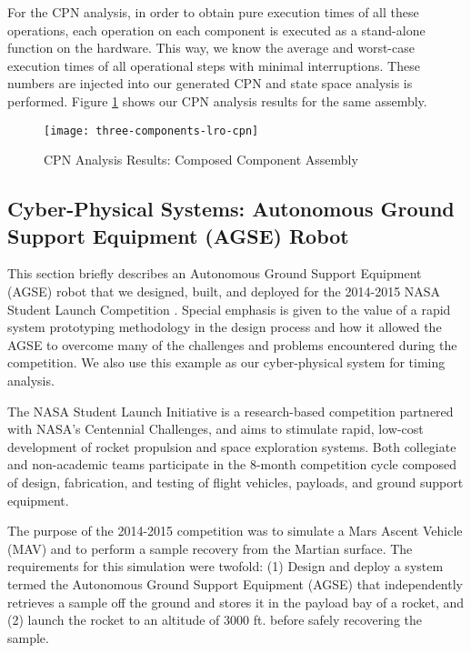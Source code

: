 For the CPN analysis, in order to obtain pure execution times of all these operations, each operation on each component is executed as a stand-alone function on the hardware. This way, we know the average and worst-case execution times of all operational steps with minimal interruptions. These numbers are injected into our generated CPN and state space analysis is performed. Figure \ref{fig:three-components-lro-cpn} shows our CPN analysis results for the same assembly.


\begin{figure}[h]
	\centering
	\texttt{[image: three-components-lro-cpn]}
	\caption{CPN Analysis Results: Composed Component Assembly}
	\label{fig:three-components-lro-cpn}
\end{figure}
\FloatBarrier

\subsection{Cyber-Physical Systems: Autonomous Ground Support Equipment (AGSE) Robot}

This section briefly describes an Autonomous Ground Support Equipment
(AGSE) robot that we designed, built, and deployed for the 2014-2015
NASA Student Launch Competition \cite{NASA_SL}. Special emphasis is
given to the value of a rapid system prototyping methodology in the
design process and how it allowed the AGSE to overcome many of the
challenges and problems encountered during the competition.  We also use
this example as our cyber-physical system for timing analysis.

The NASA Student Launch Initiative \cite{NASA_SL} is a research-based
competition partnered with NASA's Centennial Challenges, and aims to
stimulate rapid, low-cost development of rocket propulsion and space
exploration systems.  Both collegiate and non-academic teams
participate in the 8-month competition cycle composed of design,
fabrication, and testing of flight vehicles, payloads, and ground
support equipment.

The purpose of the 2014-2015 competition was to simulate a Mars Ascent
Vehicle (MAV) and to perform a sample recovery from the Martian
surface. The requirements for this simulation were twofold: (1) Design
and deploy a system termed the Autonomous Ground Support Equipment
(AGSE) that independently retrieves a sample off the ground and stores
it in the payload bay of a rocket, and (2) launch the rocket to an
altitude of 3000 ft. before safely recovering the sample.

